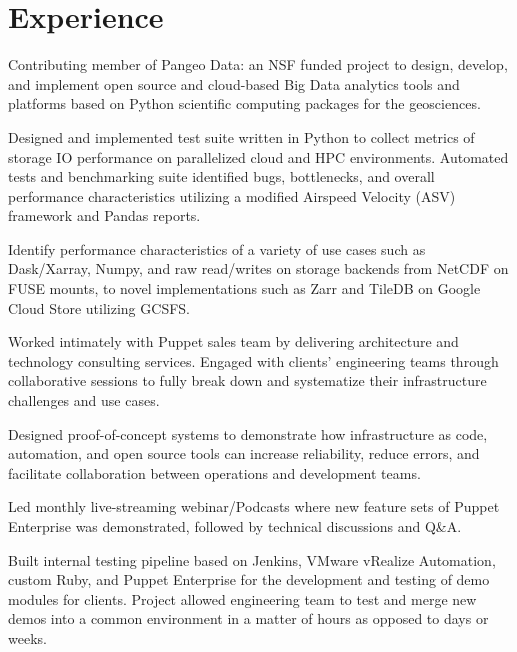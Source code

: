 \documentclass[]{deedy-resume-openfont}
\begin{document}
\hfill
\begin{minipage}[t]{0.66\textwidth} 


\section{Experience}

\vspace{\topsep} %
\begin{tightemize}
    \item Contributing member of Pangeo Data: an NSF funded project to design, develop, and implement open source and cloud-based Big Data analytics tools and platforms based on Python scientific computing packages for the geosciences.
    \item Designed and implemented test suite written in Python  to collect metrics of storage IO performance on parallelized cloud and HPC environments. Automated tests and benchmarking suite identified bugs, bottlenecks, and overall performance characteristics utilizing a modified Airspeed Velocity (ASV) framework and Pandas reports.
    \item Identify performance characteristics of a variety of use cases such as Dask/Xarray, Numpy, and raw read/writes on storage backends from NetCDF on FUSE mounts, to novel implementations such as Zarr and TileDB on Google Cloud Store utilizing GCSFS.
\end{tightemize}
\sectionsep

\begin{tightemize}
\item  Worked intimately with Puppet sales team by delivering architecture and technology consulting services. Engaged with clients' engineering teams through collaborative sessions to fully break down and systematize their infrastructure challenges and use cases.
\item Designed proof-of-concept systems to demonstrate how infrastructure as code, automation, and open source tools can increase reliability, reduce errors, and facilitate collaboration between operations and development teams. 
\item Led monthly live-streaming webinar/Podcasts where new feature sets of Puppet Enterprise was demonstrated, followed by technical discussions and Q\&A.
\item Built internal testing pipeline based on Jenkins, VMware vRealize Automation, custom Ruby, and Puppet Enterprise for the development and testing of demo modules for clients. Project allowed engineering team to test and merge new demos into a common environment in a matter of hours as opposed to days or weeks.\end{tightemize}
\sectionsep


\end{minipage}
\end{document}
